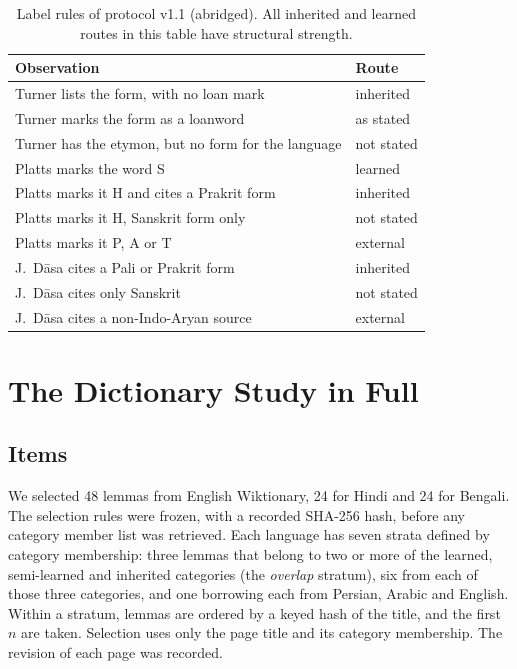 \documentclass[11pt]{article}
\begin{document}
\begin{table}[h]
\centering\small
\begin{tabular}{p{}p{}}
\toprule
\textbf{Observation} & \textbf{Route} \\
\midrule
Turner lists the form, with no loan mark & inherited \\
Turner marks the form as a loanword & as stated \\
Turner has the etymon, but no form for the language & not stated \\
Platts marks the word S & learned \\
Platts marks it H and cites a Prakrit form & inherited \\
Platts marks it H, Sanskrit form only & not stated \\
Platts marks it P, A or T & external \\
J.~D\=asa cites a Pali or Prakrit form & inherited \\
J.~D\=asa cites only Sanskrit & not stated \\
J.~D\=asa cites a non-Indo-Aryan source & external \\
\bottomrule
\end{tabular}
\caption{Label rules of protocol v1.1 (abridged). All inherited and learned routes in this table have structural strength.}
\label{tab:rules}
\end{table}

\section{The Dictionary Study in Full}
\label{sec:method}

\subsection{Items}

We selected 48 lemmas from English Wiktionary, 24 for Hindi and 24 for Bengali. The selection rules were frozen, with a recorded SHA-256 hash, before any category member list was retrieved. Each language has seven strata defined by category membership: three lemmas that belong to two or more of the learned, semi-learned and inherited categories (the \textit{overlap} stratum), six from each of those three categories, and one borrowing each from Persian, Arabic and English. Within a stratum, lemmas are ordered by a keyed hash of the title, and the first $n$ are taken. Selection uses only the page title and its category membership. The revision of each page was recorded.
\end{document}
